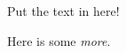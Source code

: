 \documentclass{article}
\begin{document}
Put the text in here!

Here is some \emph{more}.
\end{document}
